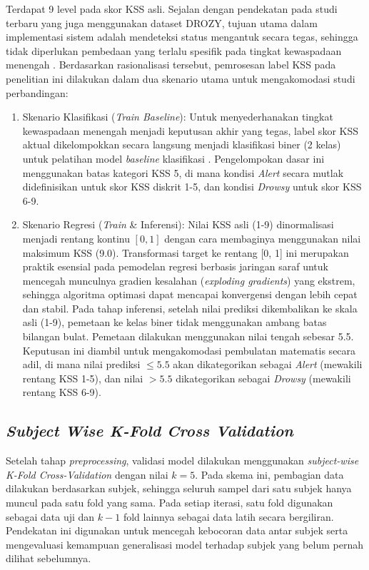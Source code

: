 Terdapat 9 level pada skor KSS asli. Sejalan dengan pendekatan pada studi terbaru yang juga menggunakan dataset DROZY, tujuan utama dalam implementasi sistem adalah mendeteksi status mengantuk secara tegas, sehingga tidak diperlukan pembedaan yang terlalu spesifik pada tingkat kewaspadaan menengah \cite{zayed2025novel}. Berdasarkan rasionalisasi tersebut, pemrosesan label KSS pada penelitian ini dilakukan dalam dua skenario utama untuk mengakomodasi studi perbandingan:
\begin{enumerate}
    \item Skenario Klasifikasi (\textit{Train Baseline}): Untuk menyederhanakan tingkat kewaspadaan menengah menjadi keputusan akhir yang tegas, label skor KSS aktual dikelompokkan secara langsung menjadi klasifikasi biner (2 kelas) untuk pelatihan model \textit{baseline} klasifikasi \cite{zayed2025novel}. Pengelompokan dasar ini menggunakan batas kategori KSS 5, di mana kondisi \textit{Alert} secara mutlak didefinisikan untuk skor KSS diskrit 1-5, dan kondisi \textit{Drowsy} untuk skor KSS 6-9.

    \item Skenario Regresi (\textit{Train} \& Inferensi): Nilai KSS asli (1-9) dinormalisasi menjadi rentang kontinu $[0, 1]$ dengan cara membaginya menggunakan nilai maksimum KSS (9.0). Transformasi target ke rentang [0, 1] ini merupakan praktik esensial pada pemodelan regresi berbasis jaringan saraf untuk mencegah munculnya gradien kesalahan (\textit{exploding gradients}) yang ekstrem, sehingga algoritma optimasi dapat mencapai konvergensi dengan lebih cepat dan stabil. Pada tahap inferensi, setelah nilai prediksi dikembalikan ke skala asli (1-9), pemetaan ke kelas biner tidak menggunakan ambang batas bilangan bulat. Pemetaan dilakukan menggunakan nilai tengah sebesar 5.5. Keputusan ini diambil untuk mengakomodasi pembulatan matematis secara adil, di mana nilai prediksi $\le 5.5$ akan dikategorikan sebagai \textit{Alert} (mewakili rentang KSS 1-5), dan nilai $> 5.5$ dikategorikan sebagai \textit{Drowsy} (mewakili rentang KSS 6-9).
\end{enumerate}

\subsection{\textit{Subject Wise K-Fold Cross Validation}} \label{III.Langkah4}

Setelah tahap \textit{preprocessing}, validasi model dilakukan menggunakan \textit{subject-wise K-Fold Cross-Validation} dengan nilai $k = 5$. Pada skema ini, pembagian data dilakukan berdasarkan subjek, sehingga seluruh sampel dari satu subjek hanya muncul pada satu fold yang sama. Pada setiap iterasi, satu fold digunakan sebagai data uji dan $k-1$ fold lainnya sebagai data latih secara bergiliran. Pendekatan ini digunakan untuk mencegah kebocoran data antar subjek serta mengevaluasi kemampuan generalisasi model terhadap subjek yang belum pernah dilihat sebelumnya.

